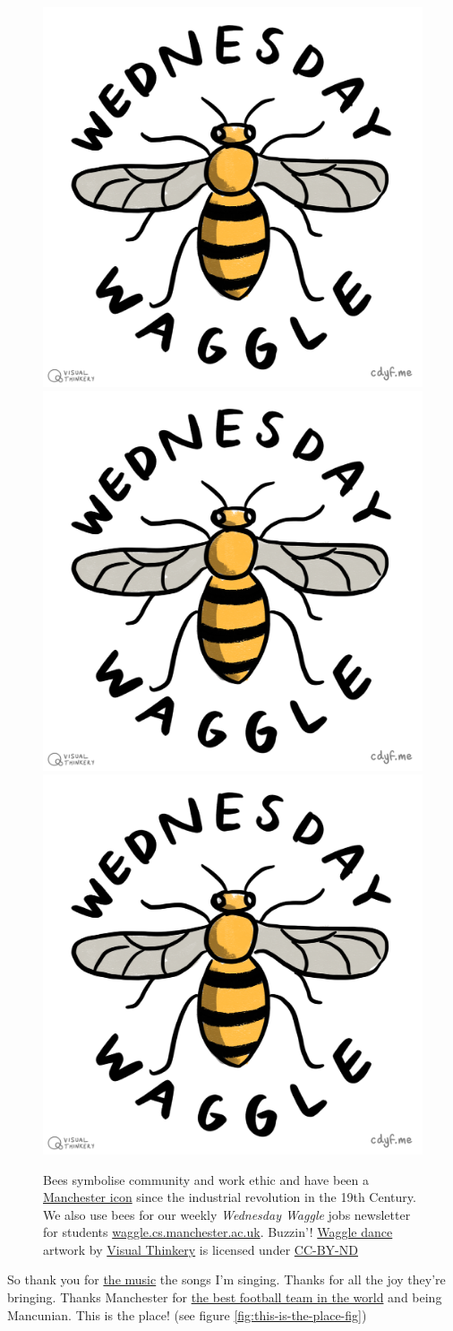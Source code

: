 \documentclass[
]{book}
\begin{document}
\begin{figure}
\includegraphics[width=0.33\linewidth]{images/Wednesday_Waggle} \includegraphics[width=0.33\linewidth]{images/Wednesday_Waggle} \includegraphics[width=0.33\linewidth]{images/Wednesday_Waggle} \caption{Bees symbolise community and work ethic and have been a \href{https://en.wikipedia.org/wiki/Symbols_of_Manchester}{Manchester icon} since the industrial revolution in the 19th Century. We also use bees for our weekly \emph{Wednesday Waggle} jobs newsletter for students \href{https://waggle.cs.manchester.ac.uk/}{waggle.cs.manchester.ac.uk}. Buzzin'! \href{https://en.wikipedia.org/wiki/Waggle_dance}{Waggle dance} artwork by \href{https://visualthinkery.com/}{Visual Thinkery} is licensed under \href{https://creativecommons.org/licenses/by-nd/4.0/}{CC-BY-ND} 🐝}\label{fig:waggle-fig}
\end{figure}



So thank you for \href{https://en.wikipedia.org/wiki/Popular_music_of_Manchester}{the music} the songs I'm singing. Thanks for all the joy they're bringing. Thanks Manchester for \href{https://en.wikipedia.org/wiki/Manchester_United_F.C.}{the best football team in the world} and being Mancunian. This is the place! (see figure \ref{fig:this-is-the-place-fig})
\end{document}
